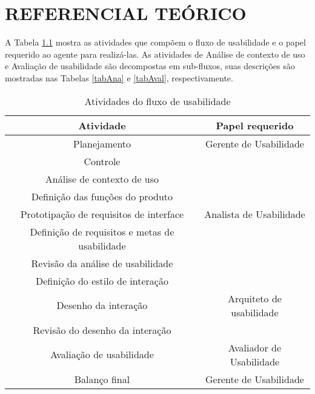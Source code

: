 
\chapter{REFERENCIAL TEÓRICO}


	A Tabela \ref{tabFluxoUsa} mostra as atividades que compõem o fluxo de usabilidade e o papel requerido ao agente para realizá-las. As atividades de Análise de contexto de uso e Avaliação de usabilidade são decompostas em sub-fluxos, suas descrições são mostradas nas Tabelas \ref{tabAna} e \ref{tabAval}, respectivamente.

    \begin{table}[h]
        \begin{center}
    		\begin{tabular}{|c|c|}
    			\hline
                \textbf{Atividade} & \textbf{Papel requerido} \\ \hline
    			Planejamento & Gerente de Usabilidade \\
    			Controle  & \\
    			\hline
                Análise de contexto de uso &  \\
                Definição das funções do produto &  \\
                Prototipação de requisitos de interface & Analista de Usabilidade \\
                Definição de requisitos e metas de usabilidade & \\
                Revisão da análise de usabilidade & \\
                \hline
                Definição do estilo de interação & \\
                Desenho da interação & Arquiteto de usabilidade \\
                Revisão do desenho da interação & \\
                \hline
                Avaliação de usabilidade & Avaliador de Usabilidade  \\
                \hline
                Balanço final & Gerente de Usabilidade  \\
                \hline
    		\end{tabular}
    		\caption{Atividades do fluxo de usabilidade}
        	\label{tabFluxoUsa}
    	\end{center}
    \end{table}

